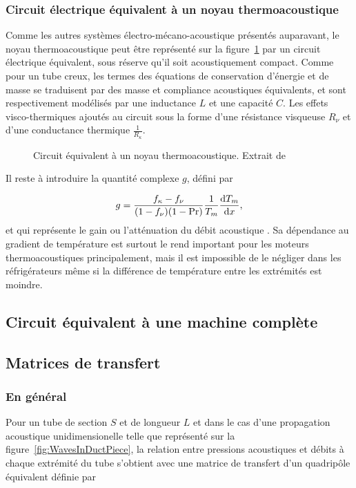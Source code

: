 \subsubsection{Circuit électrique équivalent à un noyau thermoacoustique}

Comme les autres systèmes électro-mécano-acoustique présentés auparavant, le noyau thermoacoustique peut être représenté sur la figure~\ref{fig:CircEquivTAC} par un circuit électrique équivalent, sous réserve qu'il soit acoustiquement compact. Comme pour un tube creux, les termes des équations de conservation d'énergie et de masse se traduisent par des masse et compliance acoustiques équivalents, et sont respectivement modélisés par une inductance $L$ et une capacité $C$. Les effets visco-thermiques ajoutés au circuit sous la forme d'une résistance visqueuse $R_\nu$ et d'une conductance thermique $\frac{1}{R_\kappa}$.

\begin{figure}[!ht]
    \centering
    
    \caption{Circuit équivalent à un noyau thermoacoustique. Extrait de \cite{swift_thermoacoustics_2017}}
    \label{fig:CircEquivTAC}
\end{figure}

Il reste à introduire la quantité complexe $g$, défini par 

\begin{equation}
    g = \frac{f_\kappa - f_\nu}{(1-f_\nu)(1-\mathrm{Pr})}\frac{1}{T_m}\frac{\mathrm{d} T_m}{\mathrm{d} x},
    \label{eq:GainNoyauTA_Swift}
\end{equation}
et qui représente le gain ou l'atténuation du débit acoustique \cite{swift_thermoacoustics_2017}. Sa dépendance au gradient de température est surtout le rend important pour les moteurs thermoacoustiques principalement, mais il est impossible de le négliger dans les réfrigérateurs même si la différence de température entre les extrémités est moindre.

\subsection{Circuit équivalent à une machine complète}

\subsection{Matrices de transfert}
\subsubsection{En général}
Pour un tube de section $S$ et de longueur $L$ et dans le cas d'une propagation acoustique unidimensionelle telle que représenté sur la figure~\ref{fig:WavesInDuctPiece}, la relation entre pressions acoustiques et débits à chaque extrémité du tube s'obtient avec une matrice de transfert d'un quadripôle équivalent définie par  

